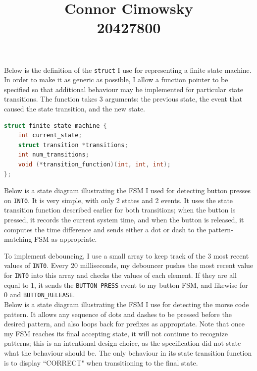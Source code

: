 \documentclass[11pt]{article}
\title{Connor Cimowsky\protect\\20427800}
\date{}
\begin{document}
\maketitle

Below is the definition of the \texttt{struct} I use for representing a finite
state machine. In order to make it as generic as possible, I allow a function
pointer to be specified so that additional behaviour may be implemented for
particular state transitions. The function takes 3 arguments: the previous
state, the event that caused the state transition, and the new state.

\begin{lstlisting}[language=c, frame=single]
struct finite_state_machine {
    int current_state;
    struct transition *transitions;
    int num_transitions;
    void (*transition_function)(int, int, int);
};
\end{lstlisting}
\vspace{1em}

Below is a state diagram illustrating the FSM I used for detecting button
presses on \texttt{INT0}. It is very simple, with only 2 states and 2 events.
It uses the state transition function described earlier for both transitions;
when the button is pressed, it records the current system time, and when the
button is released, it computes the time difference and sends either a dot or
dash to the pattern-matching FSM as appropriate.

\begin{figure}[H]
\centering
{}
\end{figure}

To implement debouncing, I use a small array to keep track of the 3 most recent
values of \texttt{INT0}. Every 20 milliseconds, my debouncer pushes the most
recent value for \texttt{INT0} into this array and checks the values of each
element. If they are all equal to 1, it sends the \texttt{BUTTON\_PRESS} event
to my button FSM, and likewise for 0 and \texttt{BUTTON\_RELEASE}.\\

Below is a state diagram illustrating the FSM I use for detecting the morse code
pattern. It allows any sequence of dots and dashes to be pressed before the
desired pattern, and also loops back for prefixes as appropriate. Note that once
my FSM reaches its final accepting state, it will not continue to recognize
patterns; this is an intentional design choice, as the specification did not
state what the behaviour should be. The only behaviour in its state transition
function is to display ``CORRECT" when transitioning to the final state.

\begin{figure}[H]
\centering
{}
\end{figure}
\end{document}
